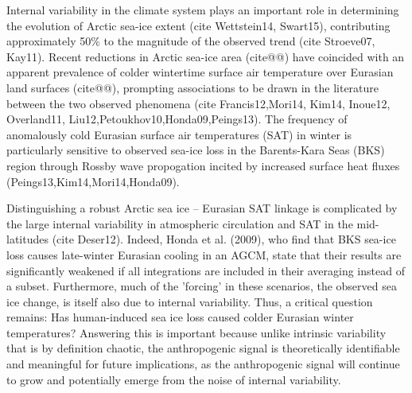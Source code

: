 \documentclass[grl]{AGUTeX}  %
\begin{document}
\begin{article}

%
%



Internal variability in the climate system plays an important role in determining the evolution of Arctic sea-ice extent (cite Wettstein14, Swart15), contributing approximately 50\% to the magnitude of the observed trend (cite Stroeve07, Kay11). Recent reductions in Arctic sea-ice area (cite@@) have coincided with an apparent prevalence of colder wintertime surface air temperature over Eurasian land surfaces (cite@@), prompting associations to be drawn in the literature between the two observed phenomena (cite Francis12,Mori14, Kim14, Inoue12, Overland11, Liu12,Petoukhov10,Honda09,Peings13). The frequency of anomalously cold Eurasian surface air temperatures (SAT) in winter is particularly sensitive to observed sea-ice loss in the Barents-Kara Seas (BKS) region through Rossby wave propogation incited by increased surface heat fluxes (Peings13,Kim14,Mori14,Honda09). %

Distinguishing a robust Arctic sea ice -- Eurasian SAT linkage is complicated by the large internal variability in atmospheric circulation and SAT in the mid-latitudes (cite Deser12). Indeed, Honda et al. (2009), who find that BKS sea-ice loss causes late-winter Eurasian cooling in an AGCM, state that their results are significantly weakened if all integrations are included in their averaging instead of a subset. Furthermore, much of the 'forcing' in these scenarios, the observed sea ice change, is itself also due to internal variability. Thus, a critical question remains: Has human-induced sea ice loss caused colder Eurasian winter temperatures? Answering this is important because unlike intrinsic variability that is by definition chaotic, the anthropogenic signal is theoretically identifiable and meaningful for future implications, as the anthropogenic signal will continue to grow and potentially emerge from the noise of internal variability.


\end{article}
\end{document}
